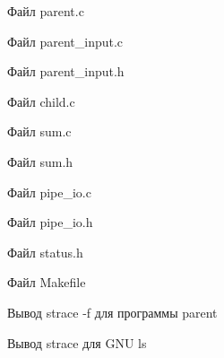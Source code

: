 \documentclass[12pt,a4paper]{article}
\begin{document}
\begin{listingblock}{Файл parent.c}\end{listingblock}
\begin{listingblock}{Файл parent\_input.c}\end{listingblock}
\begin{listingblock}{Файл parent\_input.h}\end{listingblock}
\begin{listingblock}{Файл child.c}\end{listingblock}
\begin{listingblock}{Файл sum.c}\end{listingblock}
\begin{listingblock}{Файл sum.h}\end{listingblock}
\begin{listingblock}{Файл pipe\_io.c}\end{listingblock}
\begin{listingblock}{Файл pipe\_io.h}\end{listingblock}
\begin{listingblock}{Файл status.h}\end{listingblock}
\begin{listingblock}{Файл Makefile}\end{listingblock}


\begin{listingblock}{Вывод strace -f для программы parent}\end{listingblock}


\begin{listingblock}{Вывод strace для GNU ls}\end{listingblock}
\end{document}
